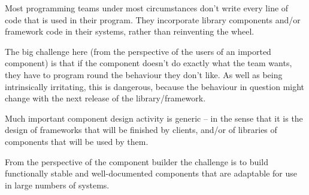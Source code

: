 \documentclass{ip3}
\begin{document}
\begin{foil}
\begin{itemize}
\begin{itemize}
\begin{note}
                      Most programming teams under most circumstances
                      don't write every line of code that is used
                      in their program. They incorporate library
                      components and/or framework code in their systems,
                      rather than reinventing the wheel.

                      The big challenge here (from the perspective
                      of the users of an imported component) is that
                      if the component doesn't do exactly what the
                      team wants, they have to program round the
                      behaviour they don't like.  As well as being
                      intrinsically irritating, this is dangerous,
                      because the behaviour in question might change
                      with the next release of the library/framework.

                      Much important component design activity is
                      generic -- in the sense that it is the design
                      of frameworks that will be finished by clients,
                      and/or of libraries of components that will
                      be used by them.                      

                      From the perspective of the component builder 
                      the challenge is to build functionally stable
                      and well-documented components that are
                      adaptable for use in large numbers of systems.
                \end{note}
        \end{itemize}
\end{itemize}
\end{foil}
\end{document}
